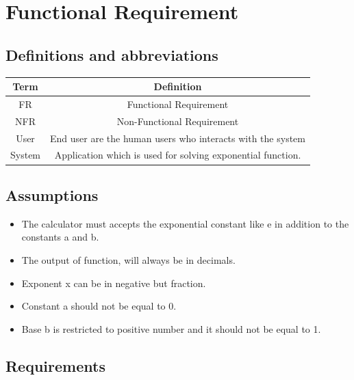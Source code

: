 \documentclass[a4paper,12pt]{report}
\begin{document}
\section{Functional Requirement}
\subsection{Definitions and abbreviations}
\begin{center}
    \begin{tabular}{|c|c|}
         \hline
         Term & Definition \\
         \hline\hline
         FR & Functional Requirement \\
         \hline
         NFR & Non-Functional Requirement \\
         \hline
         User & End user are the human users who interacts with the system \\
         \hline
         System & Application which is used for solving exponential function. \\
         \hline
        \end{tabular}
        \label{tab:xyz}
\end{center}

\subsection{Assumptions}
\begin{itemize}
    \item The calculator must accepts the exponential constant like e in addition to the constants a and b.
    \item The output of function, will always be in decimals.
    \item Exponent x can be in negative but fraction.
    \item Constant a should not be equal to 0.
    \item Base b is restricted to positive number and it should not be equal to 1.


\end{itemize}

\subsection{Requirements}
\end{document}
